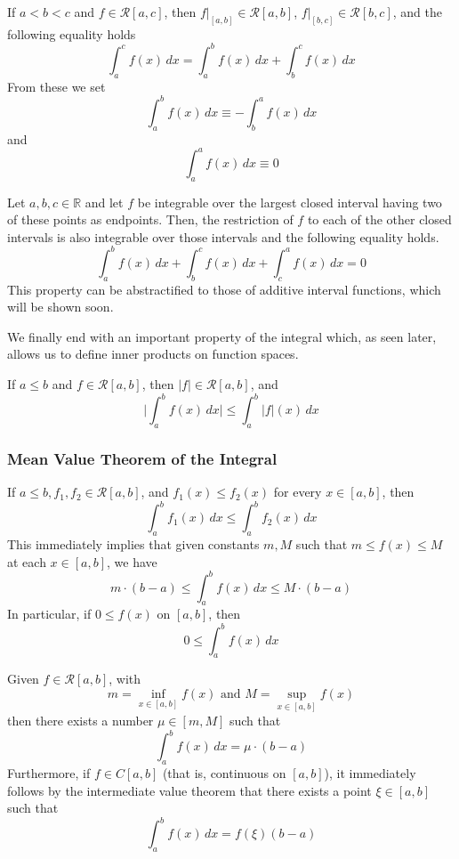     \begin{lemma}
      If $a < b < c$ and $f \in \mathcal{R}[a, c]$, then $f \big|_{[a,b]} \in \mathcal{R}[a, b]$, $f \big|_{[b,c]} \in \mathcal{R}[b, c]$, and the following equality holds 
      \[\int_a^c f(x)\,dx = \int_a^b f(x)\, dx + \int_b^c f(x)\,dx\]
      From these we set
      \[\int_a^b f(x)\,dx \equiv - \int_b^a f(x)\,dx\]
      and 
      \[\int_a^a f(x)\,dx \equiv 0\]
    \end{lemma}

    \begin{theorem}
    Let $a, b, c \in \mathbb{R}$ and let $f$ be integrable over the largest closed interval having two of these points as endpoints. Then, the restriction of $f$ to each of the other closed intervals is also integrable over those intervals and the following equality holds. 
    \[\int_a^b f(x)\,dx + \int_b^c f(x)\,dx + \int_c^a f(x)\,dx = 0\]
    This property can be abstractified to those of additive interval functions, which will be shown soon. 
    \end{theorem}

    We finally end with an important property of the integral which, as seen later, allows us to define inner products on function spaces. 
    \begin{theorem}
    If $a \leq b$ and $f \in \mathcal{R}[a, b]$, then $|f| \in \mathcal{R}[a, b]$, and 
    \[\Bigg| \int_a^b f(x)\,dx \Bigg| \leq \int_a^b |f|(x)\,dx\]
    \end{theorem}

    \subsubsection{Mean Value Theorem of the Integral}

    \begin{lemma}
      If $a \leq b, f_1, f_2 \in \mathcal{R}[a, b]$, and $f_1 (x) \leq f_2 (x)$ for every $x \in [a, b]$, then
      \[\int_a^b f_1 (x)\,dx \leq \int_a^b f_2 (x)\,dx\]
      This immediately implies that given constants $m, M$ such that $m \leq f(x) \leq M$ at each $x \in [a, b]$, we have
      \[m \cdot (b - a) \leq \int_a^b f(x)\,dx \leq M \cdot (b-a)\]
      In particular, if $0 \leq f(x)$ on $[a, b]$, then
      \[0 \leq \int_a^b f(x)\,dx\]
    \end{lemma}

    \begin{theorem}
    Given $f \in \mathcal{R}[a, b]$, with 
    \[m = \inf_{x \in [a, b]} f(x) \text{ and } M = \sup_{x \in [a, b]} f(x)\]
    then there exists a number $\mu \in [m, M]$ such that
    \[\int_a^b f(x)\,dx = \mu \cdot (b - a)\]
    Furthermore, if $f \in C[a, b]$ (that is, continuous on $[a, b]$), it immediately follows by the intermediate value theorem that there exists a point $\xi \in [a, b]$ such that
    \[\int_a^b f(x)\,dx = f(\xi) (b - a)\]
    \end{theorem}

